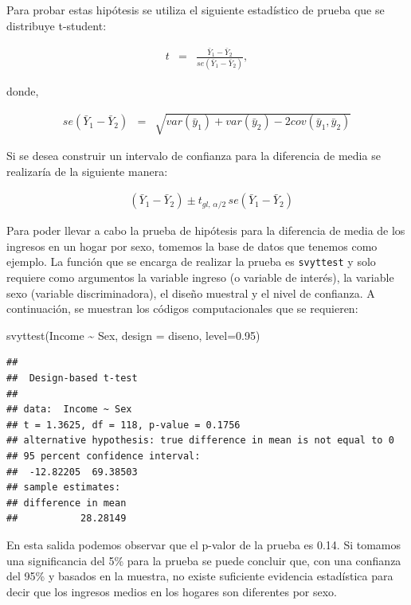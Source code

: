 \documentclass[
  12pt,
]{book}
\newenvironment{Shaded}{\begin{snugshade}}{\end{snugshade}}
\newcommand{\AttributeTok}[1]{\textcolor[rgb]{0.77,0.63,0.00}{#1}}
\newcommand{\FloatTok}[1]{\textcolor[rgb]{0.00,0.00,0.81}{#1}}
\newcommand{\FunctionTok}[1]{\textcolor[rgb]{0.00,0.00,0.00}{#1}}
\newcommand{\NormalTok}[1]{#1}
\newcommand{\SpecialCharTok}[1]{\textcolor[rgb]{0.00,0.00,0.00}{#1}}
\begin{document}
Para probar estas hipótesis se utiliza el siguiente estadístico de prueba que se distribuye t-student:

\begin{eqnarray*}
t & = & \frac{\bar{Y}_{1}-\bar{Y}_{2}}{se\left(\bar{Y}_{1}-\bar{Y}_{2}\right)},
\end{eqnarray*}

donde,

\begin{eqnarray*}
se\left(\bar{Y}_{1}-\bar{Y}_{2}\right) & = & \sqrt{var\left(\bar{y}_{1}\right)+var\left(\bar{y}_{2}\right)-2cov\left(\bar{y}_{1},\bar{y}_{2}\right)}
\end{eqnarray*}

Si se desea construir un intervalo de confianza para la diferencia de media se realizaría de la siguiente manera:

\begin{eqnarray*}
 & \left(\bar{Y}_{1}-\bar{Y}_{2}\right)\pm t_{gl,\,\alpha/2}\,se\left(\bar{Y}_{1}-\bar{Y}_{2}\right)
\end{eqnarray*}

Para poder llevar a cabo la prueba de hipótesis para la diferencia de media de los ingresos en un hogar por sexo, tomemos la base de datos que tenemos como ejemplo. La función que se encarga de realizar la prueba es \texttt{svyttest} y solo requiere como argumentos la variable ingreso (o variable de interés), la variable sexo (variable discriminadora), el diseño muestral y el nivel de confianza. A continuación, se muestran los códigos computacionales que se requieren:

\begin{Shaded}
\begin{Highlighting}[]
\FunctionTok{svyttest}\NormalTok{(Income }\SpecialCharTok{\textasciitilde{}}\NormalTok{ Sex, }\AttributeTok{design =}\NormalTok{ diseno, }\AttributeTok{level=}\FloatTok{0.95}\NormalTok{) }
\end{Highlighting}
\end{Shaded}

\begin{verbatim}
## 
##  Design-based t-test
## 
## data:  Income ~ Sex
## t = 1.3625, df = 118, p-value = 0.1756
## alternative hypothesis: true difference in mean is not equal to 0
## 95 percent confidence interval:
##  -12.82205  69.38503
## sample estimates:
## difference in mean 
##           28.28149
\end{verbatim}

En esta salida podemos observar que el p-valor de la prueba es 0.14. Si tomamos una significancia del 5\% para la prueba se puede concluir que, con una confianza del 95\% y basados en la muestra, no existe suficiente evidencia estadística para decir que los ingresos medios en los hogares son diferentes por sexo.
\end{document}
